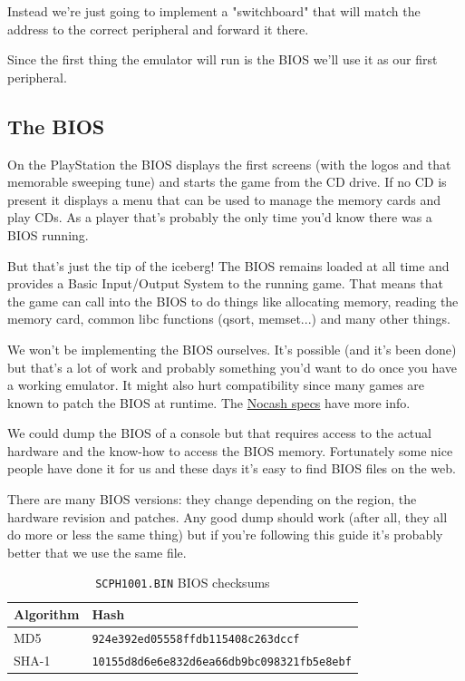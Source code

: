 \documentclass[a4paper]{article}
\newcommand{\code}[1] {\texttt{#1}}
\begin{document}
Instead we're just going to implement a "switchboard" that will match
the address to the correct peripheral and forward it there.

Since the first thing the emulator will run is the BIOS we'll use it
as our first peripheral.

\subsection{The BIOS}

On the PlayStation the BIOS displays the first screens (with the logos
and that memorable sweeping tune) and starts the game from the CD
drive. If no CD is present it displays a menu that can be used to
manage the memory cards and play CDs. As a player that's probably the
only time you'd know there was a BIOS running.

But that's just the tip of the iceberg! The BIOS remains loaded at all
time and provides a Basic Input/Output System to the running
game. That means that the game can call into the BIOS to do things
like allocating memory, reading the memory card, common libc functions
(qsort, memset...) and many other things.

We won't be implementing the BIOS ourselves. It's possible (and it's
been done) but that's a lot of work and probably something you'd want
to do once you have a working emulator. It might also hurt
compatibility since many games are known to patch the BIOS at
runtime. The
\href{http://problemkaputt.de/psx-spx.htm#biospatches}{Nocash specs}
have more info.

We could dump the BIOS of a console but that requires access to the
actual hardware and the know-how to access the BIOS
memory. Fortunately some nice people have done it for us and these
days it's easy to find BIOS files on the web.

There are many BIOS versions: they change depending on the region, the
hardware revision and patches. Any good dump should work (after all,
they all do more or less the same thing) but if you're following this
guide it's probably better that we use the same file.

\begin{table}[ht]
  \centering

  \begin{tabular}{ l | l }
    Algorithm & Hash \\
    \hline
    MD5    & \code{924e392ed05558ffdb115408c263dccf} \\
    SHA-1   & \code{10155d8d6e6e832d6ea66db9bc098321fb5e8ebf} \\
  \end{tabular}

  \caption{\code{SCPH1001.BIN} BIOS checksums}
  \label{tab:checksums}
\end{table}
\end{document}
